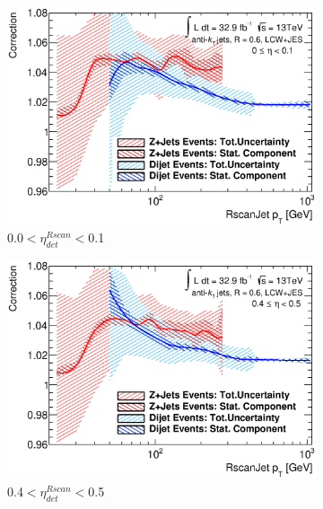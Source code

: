 \begin{figure}[ht]
    \centering
    \begin{subfigure}[b]{0.495\textwidth}
        \centering
        \includegraphics[width=\textwidth]{images/ComparisonW_dijets_Eta_45.eps}
        \caption{0.0$<\eta^{Rscan}_{det}<$0.1}
    \end{subfigure}
    \hfill
    \begin{subfigure}[b]{0.495\textwidth}
        \centering
        \includegraphics[width=\textwidth]{images/ComparisonW_dijets_Eta_49.eps}
        \caption{ 0.4$<\eta^{Rscan}_{det}<$0.5}
    \end{subfigure}
    \vfill
    \begin{subfigure}[b]{0.495\textwidth}
        \centering

\end{subfigure}
\end{figure}
